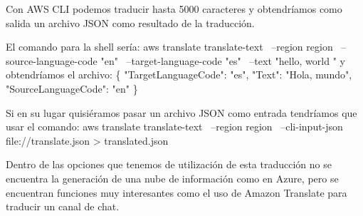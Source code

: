 \documentclass[runningheads]{llncs}
\begin{document}
Con AWS CLI podemos traducir hasta 5000 caracteres y obtendríamos como salida un archivo JSON como resultado de la traducción.

El comando para la shell sería:
aws translate translate-text \
            --region region \
            --source-language-code "en" \
            --target-language-code "es" \
            --text "hello, world " 
y obtendríamos el archivo:
\{
    "TargetLanguageCode": "es",
    "Text": "Hola, mundo",
    "SourceLanguageCode": "en"
\}

Si en su lugar quisiéramos pasar un archivo JSON como entrada tendríamos que usar el comando:
aws translate translate-text \
            --region region \
            --cli-input-json file://translate.json > translated.json

Dentro de las opciones que tenemos de utilización de esta traducción no se encuentra la generación de una nube de información como en Azure, pero se encuentran funciones muy interesantes como el uso de Amazon Translate para traducir un canal de chat.
\end{document}

